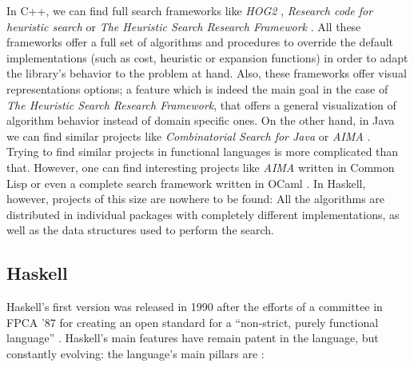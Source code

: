 In C++, we can find full search frameworks like \emph{HOG2} \cite{hog2},
\emph{Research code for heuristic search} \cite{cpp-search} or \emph{The
  Heuristic Search Research Framework} \cite{goldenberg-2017-framework}. All
these frameworks offer a full set of algorithms and procedures to override the
default implementations (such as cost, heuristic or expansion functions) in
order to adapt the library's behavior to the problem at hand. Also, these
frameworks offer visual representations options; a feature which is indeed the
main goal in the case of \emph{The Heuristic Search Research Framework}, that
offers a general visualization of algorithm behavior instead of domain specific
ones. On the other hand, in Java we can find similar projects like
\emph{Combinatorial Search for Java} \cite{cs4j} or \emph{AIMA}
\cite{java-aima}.\\

Trying to find similar projects in functional languages is more complicated
than that. However, one can find interesting projects like \emph{AIMA} written
in Common Lisp \cite{lisp-aima} or even a complete search framework written in
OCaml \cite{ocaml-search}. In Haskell, however, projects of this size are
nowhere to be found: All the algorithms are distributed in individual packages
with completely different implementations, as well as the data structures used
to perform the search.


\subsection{Haskell}

Haskell's first version was released in 1990 after the efforts of a committee
in FPCA '87 for creating an open standard for a ``non-strict, purely functional
language'' \cite{haskell-history}. Haskell's main features have remain patent
in the language, but constantly evolving: the language's main pillars are
\cite{haskell-98, haskell-2010}:

